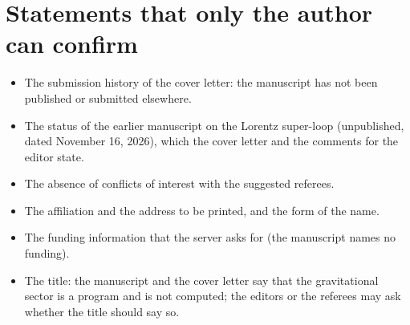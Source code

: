 \documentclass[11pt]{article}
\begin{document}
\section{Statements that only the author can confirm}
\label{sec:confirm}

\begin{itemize}
\item The submission history of the cover letter: the manuscript has not been published or submitted elsewhere.
\item The status of the earlier manuscript on the Lorentz super-loop (unpublished, dated November 16, 2026), which the
cover letter and the comments for the editor state.
\item The absence of conflicts of interest with the suggested referees.
\item The affiliation and the address to be printed, and the form of the name.
\item The funding information that the server asks for (the manuscript names no funding).
\item The title: the manuscript and the cover letter say that the gravitational sector is a program and is not computed;
the editors or the referees may ask whether the title should say so.
\end{itemize}
\end{document}
